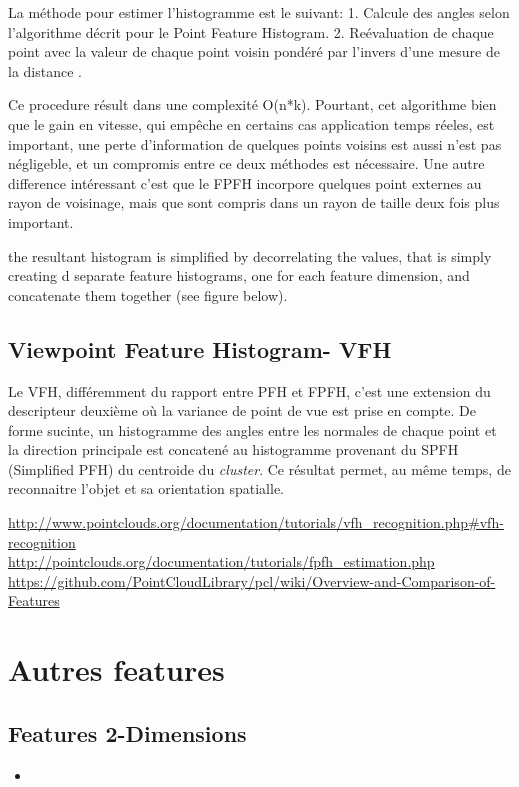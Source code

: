 La méthode pour estimer l'histogramme est le suivant:
1. Calcule des angles selon l'algorithme décrit pour le Point Feature Histogram.
2. Reévaluation de chaque point avec la valeur de chaque point voisin pondéré par l'invers d'une mesure de la distance .

Ce procedure résult dans une complexité O(n*k). Pourtant, cet algorithme bien que le gain en vitesse, qui empêche en certains cas application temps réeles, est important, une perte d'information de quelques points voisins est aussi n'est pas négligeble, et un compromis entre ce deux méthodes est nécessaire. Une autre difference intéressant c'est que le FPFH incorpore quelques point externes au rayon de voisinage, mais que sont compris dans un rayon de taille deux fois plus important.

the resultant histogram is simplified by decorrelating the values, that is simply creating d separate feature histograms, one for each feature dimension, and concatenate them together (see figure below).

\subsection{Viewpoint Feature Histogram- VFH}

Le VFH, différemment du rapport entre PFH et FPFH, c'est une extension du descripteur deuxième où la variance de point de vue est prise en compte. De forme sucinte, un histogramme des angles entre les normales de chaque point et la direction principale est concatené au histogramme provenant du SPFH (Simplified PFH) du centroide du \textit{cluster}. Ce résultat permet, au même temps, de reconnaitre l'objet et sa orientation spatialle. 


\url{http://www.pointclouds.org/documentation/tutorials/vfh_recognition.php#vfh-recognition} \\

\url{http://pointclouds.org/documentation/tutorials/fpfh_estimation.php} \\

\url{https://github.com/PointCloudLibrary/pcl/wiki/Overview-and-Comparison-of-Features} \\

\section{Autres features}


\subsection{Features 2-Dimensions}
    \begin{itemize}
         \item 
    \end{itemize}



